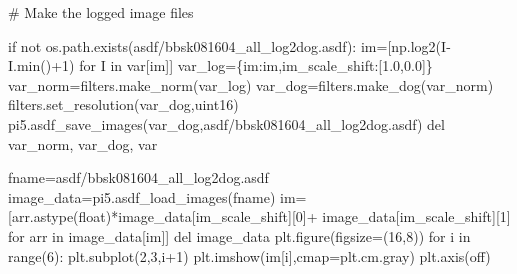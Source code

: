 \documentclass[
  letterpaper,
  DIV=11,
  numbers=noendperiod]{scrreprt}
\newenvironment{Shaded}{\begin{snugshade}}{\end{snugshade}}
\newcommand{\BuiltInTok}[1]{\textcolor[rgb]{0.00,0.23,0.31}{#1}}
\newcommand{\CommentTok}[1]{\textcolor[rgb]{0.37,0.37,0.37}{#1}}
\newcommand{\ControlFlowTok}[1]{\textcolor[rgb]{0.00,0.23,0.31}{#1}}
\newcommand{\DecValTok}[1]{\textcolor[rgb]{0.68,0.00,0.00}{#1}}
\newcommand{\FloatTok}[1]{\textcolor[rgb]{0.68,0.00,0.00}{#1}}
\newcommand{\KeywordTok}[1]{\textcolor[rgb]{0.00,0.23,0.31}{#1}}
\newcommand{\NormalTok}[1]{\textcolor[rgb]{0.00,0.23,0.31}{#1}}
\newcommand{\OperatorTok}[1]{\textcolor[rgb]{0.37,0.37,0.37}{#1}}
\newcommand{\StringTok}[1]{\textcolor[rgb]{0.13,0.47,0.30}{#1}}
\begin{document}
\begin{Shaded}
\begin{Highlighting}[]
\CommentTok{\# Make the logged image files}

\ControlFlowTok{if} \KeywordTok{not}\NormalTok{ os.path.exists(}\StringTok{\textquotesingle{}asdf/bbsk081604\_all\_log2dog.asdf\textquotesingle{}}\NormalTok{):}
\NormalTok{    im}\OperatorTok{=}\NormalTok{[np.log2(I}\OperatorTok{{-}}\NormalTok{I.}\BuiltInTok{min}\NormalTok{()}\OperatorTok{+}\DecValTok{1}\NormalTok{) }\ControlFlowTok{for}\NormalTok{ I }\KeywordTok{in}\NormalTok{ var[}\StringTok{\textquotesingle{}im\textquotesingle{}}\NormalTok{]]}
\NormalTok{    var\_log}\OperatorTok{=}\NormalTok{\{}\StringTok{\textquotesingle{}im\textquotesingle{}}\NormalTok{:im,}\StringTok{\textquotesingle{}im\_scale\_shift\textquotesingle{}}\NormalTok{:[}\FloatTok{1.0}\NormalTok{,}\FloatTok{0.0}\NormalTok{]\}}
\NormalTok{    var\_norm}\OperatorTok{=}\NormalTok{filters.make\_norm(var\_log)}
\NormalTok{    var\_dog}\OperatorTok{=}\NormalTok{filters.make\_dog(var\_norm)}
\NormalTok{    filters.set\_resolution(var\_dog,}\StringTok{\textquotesingle{}uint16\textquotesingle{}}\NormalTok{)}
\NormalTok{    pi5.asdf\_save\_images(var\_dog,}\StringTok{\textquotesingle{}asdf/bbsk081604\_all\_log2dog.asdf\textquotesingle{}}\NormalTok{) }
    \KeywordTok{del}\NormalTok{ var\_norm, var\_dog, var}
\end{Highlighting}
\end{Shaded}

\begin{Shaded}
\begin{Highlighting}[]
\NormalTok{fname}\OperatorTok{=}\StringTok{\textquotesingle{}asdf/bbsk081604\_all\_log2dog.asdf\textquotesingle{}}
\NormalTok{image\_data}\OperatorTok{=}\NormalTok{pi5.asdf\_load\_images(fname)}
\NormalTok{im}\OperatorTok{=}\NormalTok{[arr.astype(}\BuiltInTok{float}\NormalTok{)}\OperatorTok{*}\NormalTok{image\_data[}\StringTok{\textquotesingle{}im\_scale\_shift\textquotesingle{}}\NormalTok{][}\DecValTok{0}\NormalTok{]}\OperatorTok{+}
\NormalTok{        image\_data[}\StringTok{\textquotesingle{}im\_scale\_shift\textquotesingle{}}\NormalTok{][}\DecValTok{1}\NormalTok{] }\ControlFlowTok{for}\NormalTok{ arr }\KeywordTok{in}\NormalTok{ image\_data[}\StringTok{\textquotesingle{}im\textquotesingle{}}\NormalTok{]]}
\KeywordTok{del}\NormalTok{ image\_data}
\NormalTok{plt.figure(figsize}\OperatorTok{=}\NormalTok{(}\DecValTok{16}\NormalTok{,}\DecValTok{8}\NormalTok{))}
\ControlFlowTok{for}\NormalTok{ i }\KeywordTok{in} \BuiltInTok{range}\NormalTok{(}\DecValTok{6}\NormalTok{):}
\NormalTok{    plt.subplot(}\DecValTok{2}\NormalTok{,}\DecValTok{3}\NormalTok{,i}\OperatorTok{+}\DecValTok{1}\NormalTok{)}
\NormalTok{    plt.imshow(im[i],cmap}\OperatorTok{=}\NormalTok{plt.cm.gray)}
\NormalTok{    plt.axis(}\StringTok{\textquotesingle{}off\textquotesingle{}}\NormalTok{)}
\end{Highlighting}
\end{Shaded}
\end{document}

